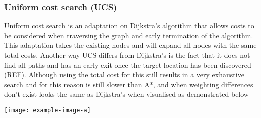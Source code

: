 \subsubsection{Uniform cost search (UCS)}
Uniform cost search is an adaptation on Dijkstra’s algorithm that allows costs to be considered when traversing the graph and early termination of the algorithm. This adaptation takes the existing nodes and will expand all nodes with the same total costs. Another way UCS differs from Dijkstra’s is the fact that it does not find all paths and has an early exit once the target location has been discovered (REF).  Although using the total cost for this still results in a very exhaustive search and for this reason is still slower than A*, and when weighting differences don’t exist looks the same as Dijkstra’s when visualised as demonstrated below
\begin{center}
\texttt{[image: example-image-a]}
\end{center}
